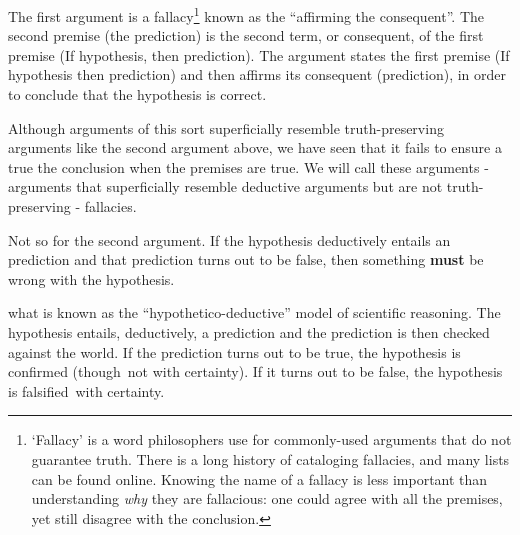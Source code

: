 \begin{refsection}
The first argument is a fallacy\footnote{`Fallacy' is a word philosophers use for commonly-used arguments that do not guarantee truth. There is a long history of cataloging fallacies, and many lists can be found online. Knowing the name of a fallacy is less important than understanding \emph{why} they are fallacious: one could agree with all the premises, yet still disagree with the conclusion.} known as the ``affirming the consequent''. The second premise (the prediction) is the second term, or consequent, of the first premise (If hypothesis, then prediction). The argument states the first premise (If hypothesis then prediction) and then affirms its consequent (prediction), in order to conclude that the hypothesis is correct. 

Although arguments of this sort superficially resemble truth-preserving arguments like the second argument above, we have seen that it fails to ensure a true the conclusion when the premises are true. We will call these arguments - arguments that superficially resemble deductive arguments but are not truth-preserving - fallacies.

Not so for the second argument. If the hypothesis deductively entails an prediction and that prediction turns out to be false, then something \textbf{must} be wrong with the hypothesis. 

 what is known as the ``hypothetico-deductive'' model of scientific reasoning. The hypothesis entails, deductively, a prediction and the prediction is then checked against the world. If the prediction turns out to be true, the hypothesis is confirmed (though not with certainty). If it turns out to be false, the hypothesis is falsified with certainty. 


\end{refsection}
